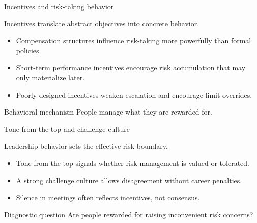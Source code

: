 \documentclass[aspectratio=169, 10pt]{beamer} %
\begin{document}
\begin{frame}{Incentives and risk-taking behavior}

Incentives translate abstract objectives into concrete behavior.

\medskip

\begin{itemize}
  \item[$\bullet$] Compensation structures influence risk-taking more
  powerfully than formal policies.

  \item[$\bullet$] Short-term performance incentives encourage risk
  accumulation that may only materialize later.

  \item[$\bullet$] Poorly designed incentives weaken escalation and
  encourage limit overrides.
\end{itemize}

\begin{block}{Behavioral mechanism}
People manage what they are rewarded for.
\end{block}

\end{frame}
\begin{frame}{Tone from the top and challenge culture}

Leadership behavior sets the effective risk boundary.

\medskip

\begin{itemize}
  \item[$\bullet$] Tone from the top signals whether risk management
  is valued or tolerated.

  \item[$\bullet$] A strong challenge culture allows disagreement
  without career penalties.

  \item[$\bullet$] Silence in meetings often reflects incentives,
  not consensus.
\end{itemize}

\begin{block}{Diagnostic question}
Are people rewarded for raising inconvenient risk concerns?
\end{block}

\end{frame}
\end{document}
